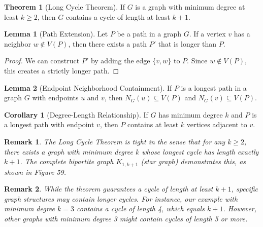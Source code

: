 \documentclass{article}
\newtheorem{remark}{Remark}
\theoremstyle{definition}
\newtheorem{theorem}{Theorem}
\newtheorem{lemma}{Lemma}
\newtheorem{corollary}{Corollary}
\begin{document}
\begin{theorem}[Long Cycle Theorem]
If $G$ is a graph with minimum degree at least $k \geq 2$, then $G$ contains a cycle of length at least $k + 1$.
\end{theorem}

\begin{lemma}[Path Extension]
Let $P$ be a path in a graph $G$. If a vertex $v$ has a neighbor $w \notin V(P)$, then there exists a path $P'$ that is longer than $P$.
\end{lemma}

\begin{proof}
We can construct $P'$ by adding the edge $\{v,w\}$ to $P$. Since $w \notin V(P)$, this creates a strictly longer path.
\end{proof}

\begin{lemma}[Endpoint Neighborhood Containment]
If $P$ is a longest path in a graph $G$ with endpoints $u$ and $v$, then $N_G(u) \subseteq V(P)$ and $N_G(v) \subseteq V(P)$.
\end{lemma}

\begin{corollary}[Degree-Length Relationship]
If $G$ has minimum degree $k$ and $P$ is a longest path with endpoint $v$, then $P$ contains at least $k$ vertices adjacent to $v$.
\end{corollary}

\begin{remark}
The Long Cycle Theorem is tight in the sense that for any $k \geq 2$, there exists a graph with minimum degree $k$ whose longest cycle has length exactly $k+1$. The complete bipartite graph $K_{1,k+1}$ (star graph) demonstrates this, as shown in Figure 59.
\end{remark}

\begin{remark}
While the theorem guarantees a cycle of length at least $k+1$, specific graph structures may contain longer cycles. For instance, our example with minimum degree $k=3$ contains a cycle of length 4, which equals $k+1$. However, other graphs with minimum degree 3 might contain cycles of length 5 or more.
\end{remark}
\end{document}
